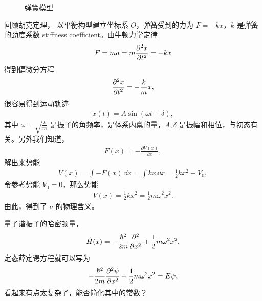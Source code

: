 \begin{figure}[tp]\centering
    \caption{弹簧模型}
    \end{figure}
回顾胡克定理，
以平衡构型建立坐标系 $O$，弹簧受到的力为 $F = -kx$，$k$ 是弹簧的劲度系数 stiffness coefficient。由牛顿力学定律
\begin{align}
    F = ma = m \pdv[2]{x}{t} = -k x
\end{align}
得到偏微分方程
\begin{align}
    \pdv[2]{x}{t} = - \frac km x,
\end{align}
很容易得到运动轨迹
\begin{align}
    x(t) = A \sin(\omega t + \delta),
\end{align}
其中 $\omega = \sqrt{\frac{k}m}$ 是振子的角频率，是体系内禀的量，$A,\delta$ 是振幅和相位，与初态有关。另外我们知道，
\begin{align}
    F(x) = -\frac{\partial V(x)}{\partial x}, 
\end{align}
解出来势能
\begin{align}
    V(x) = \int -F(x)\,\dd x = \int kx \, \dd x = \frac12 k x^2 + V_0,
\end{align}
令参考势能 $V_0 = 0$，那么势能
\begin{eqnarray}
    V(x) = \frac 12 kx^2 = \frac 12 m\omega^2 x^2.
\end{eqnarray}
由此，得到了 $a$ 的物理含义。

量子谐振子的哈密顿量，
\begin{align}
    \hat H(x) = -\frac{\hbar^2}{2m} \pdv[2]{x} + \frac 12 m\omega^2 x^2,
\end{align}
定态薛定谔方程就可以写为
\begin{align}
    -\frac{\hbar^2}{2m} \pdv[2]{\psi}{x} + \frac 12 m\omega^2 x^2 = E\psi,
    \label{eq:harm_seq_original}
\end{align}
看起来有点太复杂了，能否简化其中的常数？

